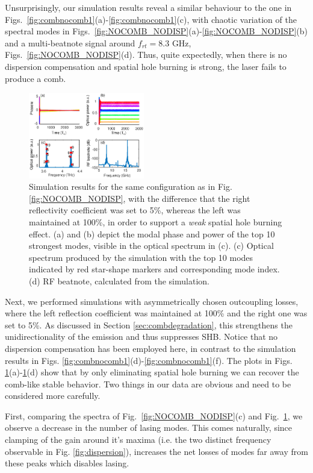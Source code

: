 \documentclass[journal]{IEEEtran}
\begin{document}
	Unsurprisingly, our simulation results reveal a similar behaviour to the one in Figs.~\ref{fig:combnocomb1}(a)-\ref{fig:combnocomb1}(c), with chaotic variation of the spectral modes in Figs.~\ref{fig:NOCOMB_NODISP}(a)-\ref{fig:NOCOMB_NODISP}(b) and a multi-beatnote signal around $f_{rt} = 8.3$ GHz, Figs.~\ref{fig:NOCOMB_NODISP}(d). Thus, quite expectedly, when there is no dispersion compensation and spatial hole burning is strong, the laser fails to produce a comb.
	
	\begin{figure}[h!]
		\centering
		\includegraphics[width=0.45\textwidth]{IMGS/COMB_NODISP}
		\caption{Simulation results for the same configuration as in Fig. 
			\ref{fig:NOCOMB_NODISP}, with the difference that the right reflectivity coefficient was set to 5\%, whereas the left was maintained at 100\%, in order to support a \emph{weak} spatial hole burning effect. (a) and (b) depict the modal phase and power of the top 10 strongest modes, visible in the optical spectrum in (c). (c) Optical spectrum produced by the simulation with the top 10 modes indicated by red star-shape markers and corresponding mode index. (d) RF beatnote, calculated from the simulation.}	\label{fig:COMB_NODISP}
	\end{figure}
	
	Next, we performed simulations with asymmetrically chosen outcoupling losses, where the left reflection coefficient was maintained at 100\% and the right one was set to 5\%. As discussed in Section \ref{sec:combdegradation}, this strengthens the unidirectionality of the emission and thus suppresses SHB. Notice that no dispersion compensation has been employed here, in contrast to the simulation results in Figs. \ref{fig:combnocomb1}(d)-\ref{fig:combnocomb1}(f). The plots in Figs. \ref{fig:COMB_NODISP}(a)-\ref{fig:COMB_NODISP}(d) show that by only eliminating spatial hole burning we can recover the comb-like stable behavior. Two things in our data are obvious and need to be considered more carefully. 
	
	First, comparing the spectra of Fig.~\ref{fig:NOCOMB_NODISP}(c) and Fig.~\ref{fig:COMB_NODISP}, we observe a decrease in the number of lasing modes. This comes naturally, since clamping of the gain around it's maxima (i.e. the two distinct frequency observable in Fig. \ref{fig:dispersion}), increases the net losses of modes far away from these peaks which disables lasing. 
	
\end{document}
